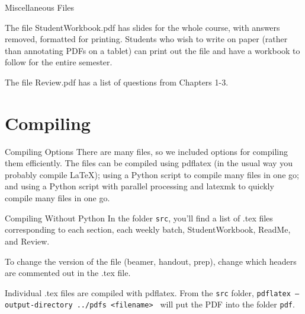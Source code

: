 \documentclass[10pt]{beamer}
\begin{document}
\begin{frame}{Miscellaneous Files}

The file StudentWorkbook.pdf has slides for the whole course, with answers removed, formatted for printing. Students who wish to write on paper (rather than annotating PDFs on a tablet) can print out the file and have a workbook to follow for the entire semester.\vfill

The file Review.pdf has a list of questions from Chapters 1-3.
\vfill

\end{frame}
\section{Compiling}
\begin{frame}{Compiling Options}
There are many files, so we included options for compiling them efficiently. The files can be compiled using pdflatex (in the usual way you probably compile LaTeX); using a Python script to compile many files in one go; and using a Python script with parallel processing and latexmk to quickly compile many files in one go.
\end{frame}
\begin{frame}{Compiling Without Python}
In the folder \texttt{src}, you'll find a list of .tex files corresponding to each section, each weekly batch, StudentWorkbook, ReadMe, and Review. 
\vfill

To change the version of the file (beamer, handout, prep), change which headers are commented out in the .tex file.

\vfill

Individual .tex files are compiled with pdflatex. From the \texttt{src} folder, \texttt{pdflatex --output-directory ../pdfs  <filename> } will put the PDF into the folder \texttt{pdf}.
\end{frame}
\end{document}
